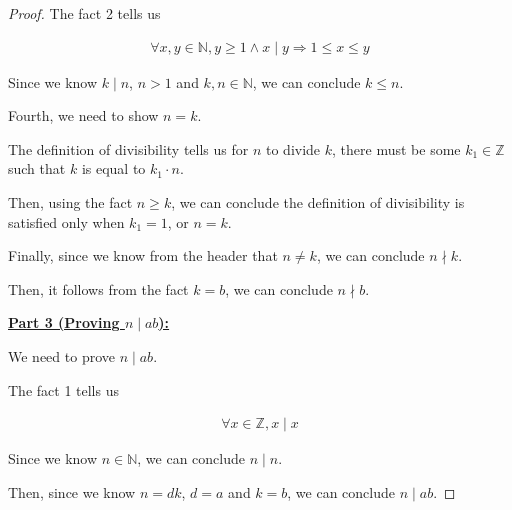 \documentclass[12pt]{article}
\begin{document}
\begin{enumerate}[a.]
\begin{proof}
    \bigskip

    The fact 2 tells us

    \begin{align}
        \forall x,y \in \mathbb{N}, y \geq 1 \land x \mid y \Rightarrow 1 \leq x \leq y
    \end{align}

    \bigskip

    Since we know $k \mid n$, $n > 1$ and $k,n \in \mathbb{N}$, we can conclude
    $k \leq n$.

    \bigskip

    Fourth, we need to show $n = k$.

    \bigskip

    The definition of divisibility tells us for $n$ to
    divide $k$, there must be some $k_1 \in \mathbb{Z}$ such that
    $k$ is equal to $k_1 \cdot n$.

    \bigskip

    Then, using the fact $n \geq k$, we can conclude the definition of
    divisibility is satisfied only when $k_1 = 1$, or $n = k$.

    \bigskip

    Finally, since we know from the header that $n \neq k$, we can conclude
    $n \nmid k$.

    \bigskip

    Then, it follows from the fact $k = b$, we can conclude $n \nmid b$.

    \bigskip

    \underline{\textbf{Part 3 (Proving $n \mid ab$):}}

    \bigskip

    We need to prove $n \mid ab$.

    \bigskip

    The fact 1 tells us

    \begin{align}
        \forall x \in \mathbb{Z}, x \mid x
    \end{align}

    \bigskip

    Since we know $n \in \mathbb{N}$, we can conclude $n \mid n$.

    \bigskip

    Then, since we know $n = dk$, $d = a$ and $k = b$, we can conclude
    $n \mid ab$.

    \end{proof}

    \bigskip


\end{enumerate}
\end{document}
